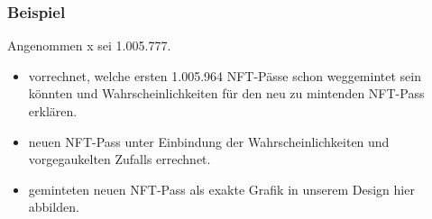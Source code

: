 
\subsubsection{Beispiel}

\vspace{0.2cm}


Angenommen x sei 1.005.777.

\begin{itemize}
  \item vorrechnet, welche ersten 1.005.964 NFT-Pässe schon weggemintet sein könnten und Wahrscheinlichkeiten für den neu zu mintenden NFT-Pass erklären.
  \item neuen NFT-Pass unter Einbindung der Wahrscheinlichkeiten und vorgegaukelten Zufalls errechnet.
  \item geminteten neuen NFT-Pass als exakte Grafik in unserem Design hier abbilden.
\end{itemize}

\vspace{0.3cm}